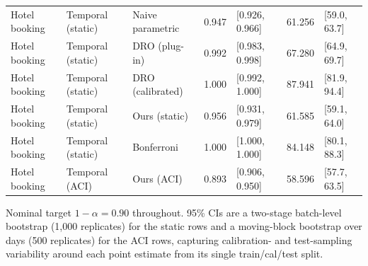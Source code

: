 \begin{table}[htbp]
\begin{tabular}{lllrlrl}
Hotel booking & Temporal (static) & Naive parametric & 0.947 & [0.926, 0.966] & 61.256 & [59.0, 63.7] \\
Hotel booking & Temporal (static) & DRO (plug-in) & 0.992 & [0.983, 0.998] & 67.280 & [64.9, 69.7] \\
Hotel booking & Temporal (static) & DRO (calibrated) & 1.000 & [0.992, 1.000] & 87.941 & [81.9, 94.4] \\
Hotel booking & Temporal (static) & Ours (static) & 0.956 & [0.931, 0.979] & 61.585 & [59.1, 64.0] \\
Hotel booking & Temporal (static) & Bonferroni & 1.000 & [1.000, 1.000] & 84.148 & [80.1, 88.3] \\
Hotel booking & Temporal (ACI) & Ours (ACI) & 0.893 & [0.906, 0.950] & 58.596 & [57.7, 63.5] \\
\bottomrule
\end{tabular}
\begin{tablenotes}\small\item Nominal target $1-\alpha=0.90$ throughout. 95\% CIs are a two-stage batch-level bootstrap (1{,}000 replicates) for the static rows and a moving-block bootstrap over days (500 replicates) for the ACI rows, capturing calibration- and test-sampling variability around each point estimate from its single train/cal/test split.\end{tablenotes}
\end{table}

